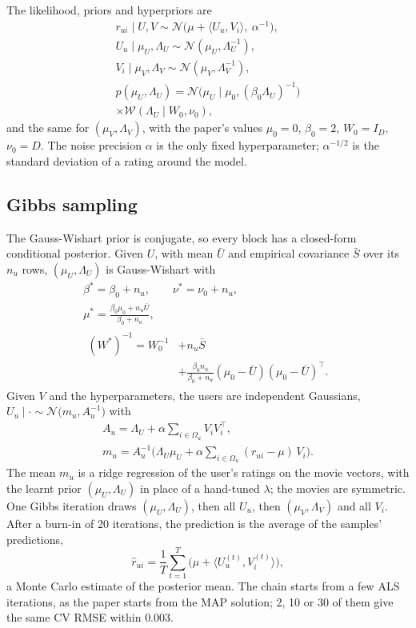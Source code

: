 \documentclass[10pt,a4paper,twocolumn]{article}
\newcommand{\N}{\mathcal{N}}
\newcommand{\rhat}{\hat r}
\begin{document}
The likelihood, priors and hyperpriors are
\begin{gather*}
r_{ui} \mid U, V \sim \N\!\big(\mu + \langle U_u, V_i\rangle,\ \alpha^{-1}\big),\\
U_u \mid \mu_U, \Lambda_U \sim \N(\mu_U, \Lambda_U^{-1}),\\
V_i \mid \mu_V, \Lambda_V \sim \N(\mu_V, \Lambda_V^{-1}),\\
p(\mu_U, \Lambda_U) = \N\!\big(\mu_U \mid \mu_0, (\beta_0\Lambda_U)^{-1}\big)\\
\times\mathcal{W}(\Lambda_U \mid W_0, \nu_0),
\end{gather*}
and the same for $(\mu_V, \Lambda_V)$, with the paper's values $\mu_0 = 0$, $\beta_0 = 2$, $W_0 = I_D$,
$\nu_0 = D$. The noise precision $\alpha$ is the only fixed hyperparameter; $\alpha^{-1/2}$ is the standard
deviation of a rating around the model.

\subsection{Gibbs sampling}
The Gauss-Wishart prior is conjugate, so every block has a closed-form conditional posterior. Given $U$, with
mean $\bar U$ and empirical covariance $\bar S$ over its $n_u$ rows, $(\mu_U, \Lambda_U)$ is Gauss-Wishart with
\begin{gather*}
\beta^* = \beta_0 + n_u,\qquad \nu^* = \nu_0 + n_u,\\
\mu^* = \frac{\beta_0\mu_0 + n_u\bar U}{\beta_0 + n_u},\\
\begin{aligned}
(W^*)^{-1} = W_0^{-1} &+ n_u\bar S\\
&+ \frac{\beta_0 n_u}{\beta_0+n_u}(\mu_0-\bar U)(\mu_0-\bar U)^\top .
\end{aligned}
\end{gather*}
Given $V$ and the hyperparameters, the users are independent Gaussians,
$U_u \mid \cdot \sim \N\!\big(m_u, A_u^{-1}\big)$ with
\begin{gather*}
A_u = \Lambda_U + \alpha\!\sum_{i\in\Omega_u}\! V_i V_i^\top,\\
m_u = A_u^{-1}\Big(\Lambda_U\mu_U + \alpha\!\sum_{i\in\Omega_u}\!(r_{ui}-\mu)\,V_i\Big).
\end{gather*}
The mean $m_u$ is a ridge regression of the user's ratings on the movie vectors, with the learnt prior
$(\mu_U, \Lambda_U)$ in place of a hand-tuned $\lambda$; the movies are symmetric. One Gibbs iteration draws
$(\mu_U,\Lambda_U)$, then all $U_u$, then $(\mu_V,\Lambda_V)$ and all $V_i$. After a burn-in of 20
iterations, the prediction is the average of the samples' predictions,
\[
\rhat_{ui} = \frac{1}{T}\sum_{t=1}^{T}\big(\mu + \langle U^{(t)}_u, V^{(t)}_i\rangle\big),
\]
a Monte Carlo estimate of the posterior mean. The chain starts from a few ALS iterations, as the paper starts
from the MAP solution; 2, 10 or 30 of them give the same CV RMSE within $0.003$.
\end{document}
